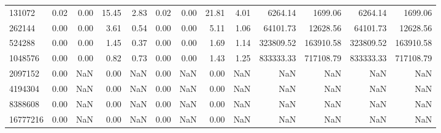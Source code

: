 \begin{tabular}{lrrrrrrrrrrrr}
131072 & 0.02 & 0.00 & 15.45 & 2.83 & 0.02 & 0.00 & 21.81 & 4.01 & 6264.14 & 1699.06 & 6264.14 & 1699.06 \\
262144 & 0.00 & 0.00 & 3.61 & 0.54 & 0.00 & 0.00 & 5.11 & 1.06 & 64101.73 & 12628.56 & 64101.73 & 12628.56 \\
524288 & 0.00 & 0.00 & 1.45 & 0.37 & 0.00 & 0.00 & 1.69 & 1.14 & 323809.52 & 163910.58 & 323809.52 & 163910.58 \\
1048576 & 0.00 & 0.00 & 0.82 & 0.73 & 0.00 & 0.00 & 1.43 & 1.25 & 833333.33 & 717108.79 & 833333.33 & 717108.79 \\
2097152 & 0.00 & NaN & 0.00 & NaN & 0.00 & NaN & 0.00 & NaN & NaN & NaN & NaN & NaN \\
4194304 & 0.00 & NaN & 0.00 & NaN & 0.00 & NaN & 0.00 & NaN & NaN & NaN & NaN & NaN \\
8388608 & 0.00 & NaN & 0.00 & NaN & 0.00 & NaN & 0.00 & NaN & NaN & NaN & NaN & NaN \\
16777216 & 0.00 & NaN & 0.00 & NaN & 0.00 & NaN & 0.00 & NaN & NaN & NaN & NaN & NaN \\
\bottomrule
\end{tabular}
